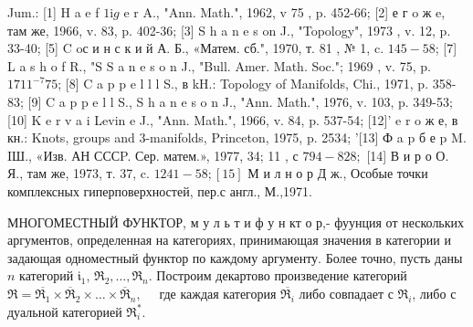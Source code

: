 \documentclass[10pt]{article}
\begin{document}
Jum.: [1] H a e f $1 \mathrm{i} g$ e r A., "Ann. Math.", 1962, v 75 , p. 452-66; [2] е г o ж e, там же, 1966, v. 83, p. 402-36; [3] S h a n e s on J., "Topology", 1973 , v. 12, p. 33-40; [5] C oс и н с к и й А. Б., «Матем. сб.", 1970, т. 81 , № 1, c. $145-58$; [7] L a s h o f R., "S $\mathrm{S}$ a n e s o n J., "Bull. Amer. Math. Soc."; 1969 , v. 75, p. $1711^{-7} 75$; [8] C a p p e l l l S., в kH.: Topology of Manifolds, Chi., 1971, p. 358-83; [9] C a p p e l l S., S h a n e s o n J., "Ann. Math.", 1976, v. 103, p. 349-53; [10] K e r v a i Levin e J., "Ann. Math.", 1966, v. 84, p. 537-54; [12]' e r o ж е, в кн.: Knots, groups and 3-manifolds, Princeton, 1975, p. 2534; '[13] Ф a p б е p M. IШ., «Изв. АН СССP. Сер. матем.», 1977, 34; 11 , с $794-828 ;$ [14] В и р о О. Я., там же, 1973, т. 37, c. $1241-58 ;[15]$ М и л н о р Д ж., Особые точки комплексных гиперповерхностей, пер.с англ., М.,1971.



МНОГОМЕСТНЫЙ ФУНКТОР, м у л ь т и ф у н кт о р,- фуунция от нескольких аргументов, определенная на категориях, принимающая значения в категории и задающая одноместный функтор по каждому аргументу. Более точно, пусть даны $n$ категорий $\mathfrak{i}_{1}$, $\mathfrak{\Re}_{2}, \ldots, \mathfrak{\Re}_{n}$. Построим декартово произведение категорий $\mathfrak{R}=\overline{\mathfrak{R}_{1}} \times \overline{\mathfrak{R}}_{2} \times \ldots \times \overline{\mathfrak{R}}_{n}, \quad$ где каждая категория $\overline{\mathfrak{R}_{i}}$ либо совпадает с $\Re_{i}$, либо с дуальной категорией $\Re_{i}^{*}$.
\end{document}
